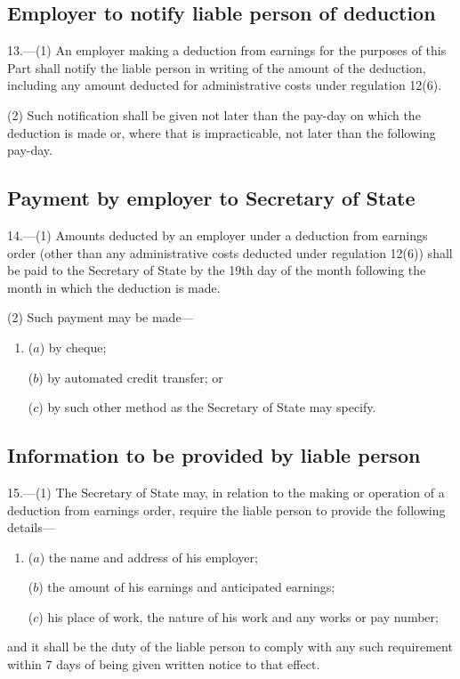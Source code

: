 \documentclass[12pt,a4paper]{article}
\begin{document}

\subsection[13. Employer to notify liable person of deduction]{Employer to notify liable person of deduction}

13.—(1) An employer making a deduction from earnings for the purposes of this Part shall notify the liable person in writing of the amount of the deduction, including any amount deducted for administrative costs under regulation 12(6).

(2) Such notification shall be given not later than the pay-day on which the deduction is made or, where that is impracticable, not later than the following pay-day.

\subsection[14. Payment by employer to Secretary of State]{Payment by employer to Secretary of State}

14.—(1) Amounts deducted by an employer under a deduction from earnings order (other than any administrative costs deducted under regulation 12(6)) shall be paid to the Secretary of State by the 19th day of the month following the month in which the deduction is made.

(2) Such payment may be made—
\begin{enumerate}\item[]
($a$) by cheque;

($b$) by automated credit transfer; or

($c$) by such other method as the Secretary of State may specify.
\end{enumerate}

\subsection[15. Information to be provided by liable person]{Information to be provided by liable person}

15.—(1) The Secretary of State may, in relation to the making or operation of a deduction from earnings order, require the liable person to provide the following details—
\begin{enumerate}\item[]
($a$) the name and address of his employer;

($b$) the amount of his earnings and anticipated earnings;

($c$) his place of work, the nature of his work and any works or pay number;
\end{enumerate}
and it shall be the duty of the liable person to comply with any such requirement within 7 days of being given written notice to that effect.
\end{document}
